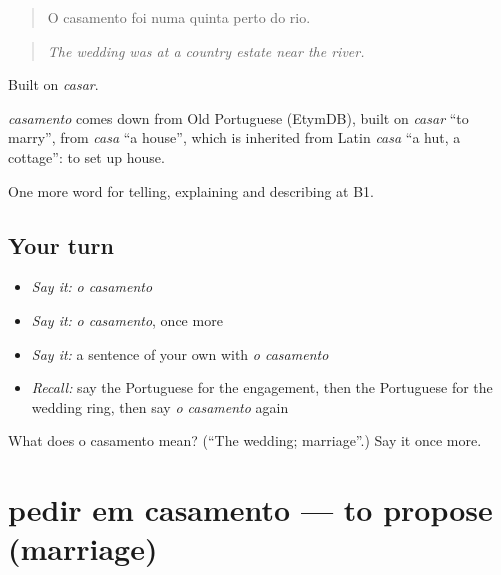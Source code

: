 \begin{quote}
O casamento foi numa quinta perto do rio.
\end{quote}

\begin{quote}
\emph{The wedding was at a country estate near the river.}
\end{quote}

Built on \emph{casar}.

\begin{cousinweb}
\emph{casamento} comes down from Old Portuguese (EtymDB), built on \emph{casar} \textquotedblleft{}to marry\textquotedblright{}, from \emph{casa} \textquotedblleft{}a house\textquotedblright{}, which is inherited from Latin \emph{casa} \textquotedblleft{}a hut, a cottage\textquotedblright{}: to set up house.
\end{cousinweb}

\begin{grammarlens}[title={What you've built}]
One more word for telling, explaining and describing at B1.
\end{grammarlens}

\subsection*{Your turn}
\begin{itemize}
\raggedright
  \item \emph{Say it:} \emph{o casamento}
  \item \emph{Say it:} \emph{o casamento}, once more
  \item \emph{Say it:} a sentence of your own with \emph{o casamento}
  \item \emph{Recall:} say the Portuguese for the engagement, then the Portuguese for the wedding ring, then say \emph{o casamento} again
\end{itemize}

\begin{tcolorbox}[breakable,colback=teal!4,colframe=teal!35!black,title={Before you move on}]
What does o casamento mean? (\textquotedblleft{}The wedding; marriage\textquotedblright{}.) Say it once more.
\end{tcolorbox}
\section[pedir em casamento]{pedir em casamento — to propose (marriage)}

\label{lesson:PT-C312-pedir-em-casamento}



